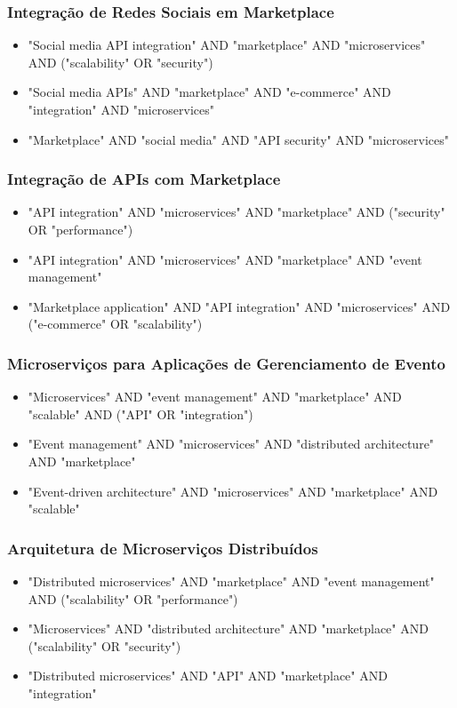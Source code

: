 \documentclass[a4paper,12pt]{article}
\begin{document}
\subsubsection{Integração de Redes Sociais em Marketplace}
\begin{itemize}
    \item "Social media API integration" AND "marketplace" AND "microservices" AND ("scalability" OR "security")
    \item "Social media APIs" AND "marketplace" AND "e-commerce" AND "integration" AND "microservices"
    \item "Marketplace" AND "social media" AND "API security" AND "microservices"
\end{itemize}

\subsubsection{Integração de APIs com Marketplace}
\begin{itemize}
    \item "API integration" AND "microservices" AND "marketplace" AND ("security" OR "performance")
    \item "API integration" AND "microservices" AND "marketplace" AND "event management"
    \item "Marketplace application" AND "API integration" AND "microservices" AND ("e-commerce" OR "scalability")
\end{itemize}

\subsubsection{Microserviços para Aplicações de Gerenciamento de Evento}
\begin{itemize}
    \item "Microservices" AND "event management" AND "marketplace" AND "scalable" AND ("API" OR "integration")
    \item "Event management" AND "microservices" AND "distributed architecture" AND "marketplace"
    \item "Event-driven architecture" AND "microservices" AND "marketplace" AND "scalable"
\end{itemize}

\subsubsection{Arquitetura de Microserviços Distribuídos}
\begin{itemize}
    \item "Distributed microservices" AND "marketplace" AND "event management" AND ("scalability" OR "performance")
    \item "Microservices" AND "distributed architecture" AND "marketplace" AND ("scalability" OR "security")
    \item "Distributed microservices" AND "API" AND "marketplace" AND "integration"
\end{itemize}
\end{document}
